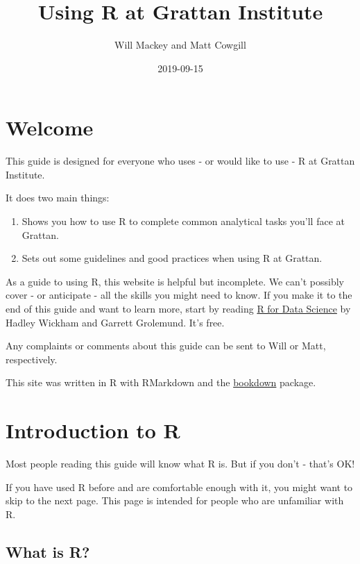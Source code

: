 \documentclass[]{book}
\title{Using R at Grattan Institute}
\author{Will Mackey and Matt Cowgill}
\date{2019-09-15}
\providecommand{\tightlist}{%
  \setlength{\itemsep}{0pt}\setlength{\parskip}{0pt}}
\begin{document}
\maketitle

{
\setcounter{tocdepth}{1}
\tableofcontents
}
\hypertarget{welcome}{%
\chapter*{Welcome}\label{welcome}}

This guide is designed for everyone who uses - or would like to use - R at Grattan Institute.

It does two main things:

\begin{enumerate}
\def\labelenumi{\arabic{enumi}.}
\tightlist
\item
  Shows you how to use R to complete common analytical tasks you'll face at Grattan.
\item
  Sets out some guidelines and good practices when using R at Grattan.
\end{enumerate}

As a guide to using R, this website is helpful but incomplete. We can't possibly cover - or anticipate - all the skills you might need to know. If you make it to the end of this guide and want to learn more, start by reading \href{https://r4ds.had.co.nz}{R for Data Science} by Hadley Wickham and Garrett Grolemund. It's free.

Any complaints or comments about this guide can be sent to Will or Matt, respectively.

This site was written in R with RMarkdown and the \href{https://bookdown.org}{bookdown} package.

\hypertarget{introduction-to-r}{%
\chapter{Introduction to R}\label{introduction-to-r}}

Most people reading this guide will know what R is. But if you don't - that's OK!

If you have used R before and are comfortable enough with it, you might want to skip to the next page. This page is intended for people who are unfamiliar with R.

\hypertarget{what-is-r}{%
\section{What is R?}\label{what-is-r}}
\end{document}
